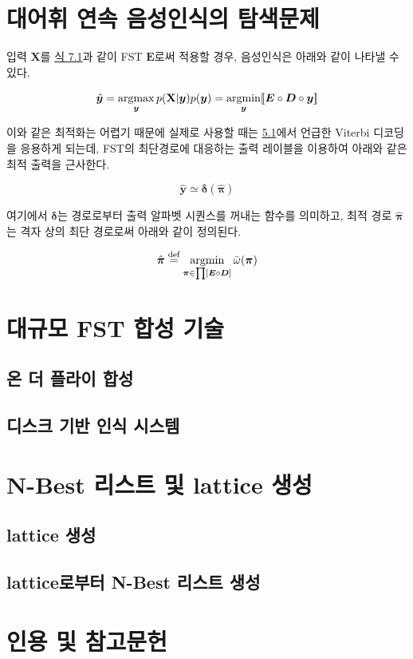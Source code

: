 \documentclass[../main.tex]{subfiles}
\begin{document}
\section{대어휘 연속 음성인식의 탐색문제}

입력 $\mathbf{X}$를 \hyperref[eq:7_1]{식 7.1}과 같이 FST $\bm{E}$로써 적용할 경우, 음성인식은 아래와 같이 나타낼 수 있다. 

\begin{equation}\label{eq:7_5}
    \hat{\bm{y}} = \operatorname*{argmax}_{\bm{y}} p( \mathbf{X} | \bm{y} ) p ( \bm{y} ) = \operatorname*{argmin}_{\bm{y}} [\![\bm{E} \circ \bm{D} \circ \bm{y}]\!]
\end{equation}

이와 같은 최적화는 어렵기 때문에 실제로 사용할 때는 \hyperref[sec:HMM]{5.1}에서 언급한 Viterbi 디코딩을 응용하게 되는데, FST의 최단경로에 대응하는 출력 레이블을 이용하여 아래와 같은 최적 출력을 근사한다. 

\begin{equation}\label{eq:7_6}
    \hat{\bm{y}} \simeq \bm{\delta}(\hat{\bm{\pi}})
\end{equation}

여기에서 $\bm{\delta}$는 경로로부터 출력 알파벳 시퀀스를 꺼내는 함수를 의미하고, 최적 경로 $\hat{\bm{\pi}}$는 격자 상의 최단 경로로써 아래와 같이 정의된다. 

\begin{equation}
    \hat{\bm{\pi}} \stackrel{\text{def}}{=} \operatorname*{argmin}_{\bm{\pi} \in \prod [ \bm{E} \circ \bm{D}] } \bar{\omega}(\bm{\pi})
\end{equation}

\section{대규모 FST 합성 기술}
\subsection{온 더 플라이 합성}
\subsection{디스크 기반 인식 시스템}

\section{N-Best 리스트 및 lattice 생성}
\subsection{lattice 생성}
\subsection{lattice로부터 N-Best 리스트 생성}

\section*{인용 및 참고문헌}
\end{document}

